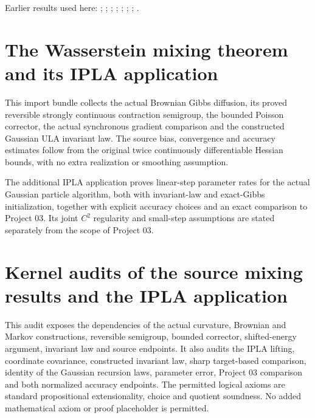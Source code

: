 \documentclass[11pt,a4paper]{report}
\begin{document}
Earlier results used here: \cite[Section~3.17.4]{LangevinLean2026ULASC}; \cite[Section~3.36.7]{LangevinLean2026ULASC}; \cite[Section~3.1.1]{LangevinLean2026IPLA}; \cite[Section~3.1.6]{LangevinLean2026IPLA}; \cite[Section~3.18.1]{LangevinLean2026IPLA}; \cite[Section~3.3.1]{LangevinLean2026IPLA}; \cite[Section~3.3.2]{LangevinLean2026IPLA}; \cite[Section~3.3.3]{LangevinLean2026IPLA}.
\section{\texorpdfstring{The Wasserstein mixing theorem and its IPLA application}{The Wasserstein mixing theorem and its IPLA application}}
\label{proof-module-WassersteinMixing-lean}


This import bundle collects the actual Brownian Gibbs diffusion, its proved reversible strongly continuous contraction semigroup, the bounded Poisson corrector, the actual synchronous gradient comparison and the constructed Gaussian ULA invariant law. The source bias, convergence and accuracy estimates follow from the original twice continuously differentiable Hessian bounds, with no extra realization or smoothing assumption.



The additional IPLA application proves linear-step parameter rates for the actual Gaussian particle algorithm, both with invariant-law and exact-Gibbs initialization, together with explicit accuracy choices and an exact comparison to Project 03. Its joint \(C^2\) regularity and small-step assumptions are stated separately from the scope of Project 03.

\section{\texorpdfstring{Kernel audits of the source mixing results and the IPLA application}{Kernel audits of the source mixing results and the IPLA application}}
\label{proof-module-WassersteinMixing-Check-lean}


This audit exposes the dependencies of the actual curvature, Brownian and Markov constructions, reversible semigroup, bounded corrector, shifted-energy argument, invariant law and source endpoints. It also audits the IPLA lifting, coordinate covariance, constructed invariant law, sharp target-based comparison, identity of the Gaussian recursion laws, parameter error, Project 03 comparison and both normalized accuracy endpoints. The permitted logical axioms are standard propositional extensionality, choice and quotient soundness. No added mathematical axiom or proof placeholder is permitted.
\end{document}
